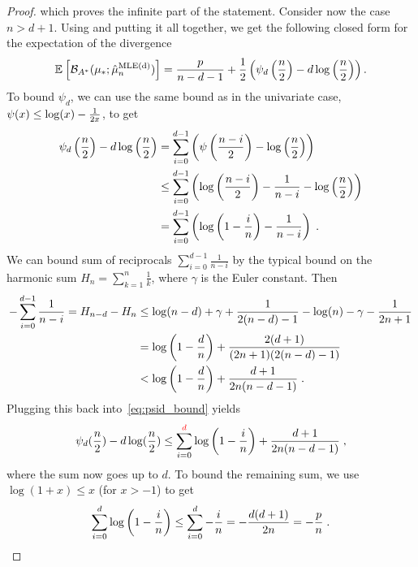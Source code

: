 \begin{proof}
which proves the infinite part of the statement.
Consider now the case $n>d+1$. Using
and putting it all together, we get the following closed form for the expectation of the divergence
 \begin{align}
 	\label{eq:where-we-put-it-back-together-multivariate-gaussian}
 	\expect{\bregmanconj( \mu_*; \hat \mu_n^\text{MLE(d)})}
 	= \frac{p}{n-d-1} + \half \left ( \psi_d\paren{\half[n]} - d \log\paren{\half[n]}  \right ).
 \end{align}
To bound $\psi_d$, we can use the same bound as in the univariate case, $\psi(x) \leq \log(x) - \inv{2x}$, to get
\begin{align}
	\psi_d\paren{\half[n]} - d \log\paren{\half[n]}
	&= \sum_{i=0}^{d-1} \paren{\psi \paren{\half[n - i]} - \log\paren{\half[n]} } \\
	&\leq \sum_{i=0}^{d-1} \paren{\log\paren{\half[n-i]} - \inv{n-i} - \log\paren{\half[n]} } \\
	&= \sum_{i=0}^{d-1} \paren{\log\paren{1 - \frac{i}{n}} - \frac{1}{n-i}} \; .
	\label{eq:psid_bound}
\end{align}
We can bound sum of reciprocals $\sum_{i=0}^{d-1} \frac{1}{n-i}$ by the typical bound on 
the harmonic sum $H_n = \sum_{k=1}^n \frac{1}{k}$,
where $\gamma$ is the Euler constant. Then
\begin{align}
	- \sum_{i=0}^{d-1} \frac{1}{n-i} 
	= H_{n-d} - H_n
	&\leq \log(n-d) + \gamma + \inv{2(n-d) - 1} - \log(n) - \gamma - \inv{2n+1} \\
	&= \log\paren{1 - \frac{d}{n}}  + \frac{2(d + 1)}{(2n+1)(2(n - d) - 1)} \\
	&< \log\paren{1 - \frac{d}{n}}  + \frac{d + 1}{2n(n - d - 1)} \; .
\end{align}
Plugging this back into~\eqref{eq:psid_bound} yields
\begin{align}
	\psi_d(\half[n]) - d \log(\half[n]) 
	\leq \sum_{i=0}^{\textcolor{red}{d}} \log\paren{1 - \frac{i}{n}}
	+  \frac{d + 1}{2n(n - d - 1)} \; ,
\end{align}
where the sum now goes up to $d$.
To bound the remaining sum, we use $\log(1+x)\leq x$ (for $x > -1$) to get
\begin{align}
	\sum_{i=0}^{d} \log\paren{1 - \frac{i}{n}}
	\leq \sum_{i=0}^{d} - \frac{i}{n}
	 = -\frac{d(d+1)}{2n} = -\frac{p}{n} \; .
\end{align}

\end{proof}
